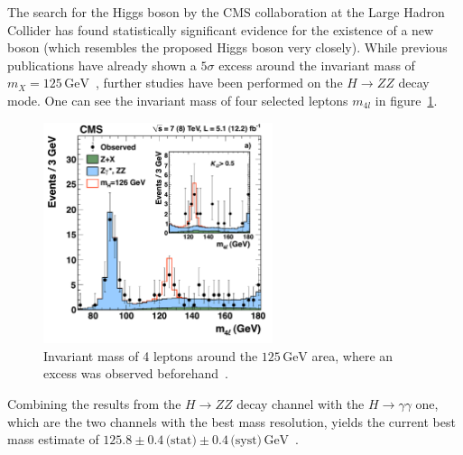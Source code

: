The search for the Higgs boson by the CMS collaboration at the Large Hadron Collider has found statistically significant evidence for the existence of a new boson (which resembles the proposed Higgs boson very closely). While previous publications have already shown a $5 \sigma$ excess around the invariant mass of $m_X = 125\,\text{GeV}$~\cite{higgscls}, further studies have been performed on the $H \rightarrow ZZ$ decay mode. One can see the invariant mass of four selected leptons $m_{4 l}$ in figure~\ref{fig:higgsmzz}.

\begin{figure}[ht!]
  \centering
    \includegraphics[width=0.6\textwidth]{plots/higgsmzz.pdf}
  \caption{Invariant mass of 4 leptons around the $125\,\text{GeV}$ area, where an excess was observed beforehand~\cite{higgsmzz}.}
  \label{fig:higgsmzz}
\end{figure}

\noindent Combining the results from the $H \rightarrow ZZ$ decay channel with the $H \rightarrow \gamma \gamma$ one, which are the two channels with the best mass resolution, yields the current best mass estimate of $125.8 \pm 0.4 \,\text{(stat)} \pm 0.4\,\text{(syst)}\,\text{GeV}$~\cite{higgsmzz}.


